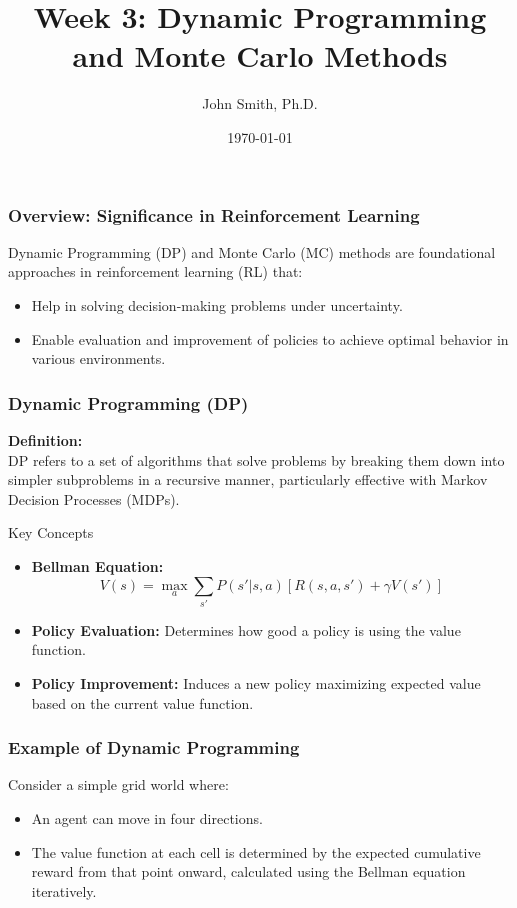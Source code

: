 \documentclass[aspectratio=169]{beamer}
\title[Dynamic Programming and Monte Carlo Methods]{Week 3: Dynamic Programming and Monte Carlo Methods}
\author[J. Smith]{John Smith, Ph.D.}
\institute[University Name]{
  Department of Computer Science\\
  University Name\\
  \vspace{0.3cm}
  Email: email@university.edu\\
  Website: www.university.edu
}
\date{\today}
\begin{document}
\frame{\titlepage}

\begin{frame}[fragile]
    \titlepage
\end{frame}

\begin{frame}[fragile]
    \frametitle{Overview: Significance in Reinforcement Learning}
    Dynamic Programming (DP) and Monte Carlo (MC) methods are foundational approaches in reinforcement learning (RL) that:
    \begin{itemize}
        \item Help in solving decision-making problems under uncertainty.
        \item Enable evaluation and improvement of policies to achieve optimal behavior in various environments.
    \end{itemize}
\end{frame}

\begin{frame}[fragile]
    \frametitle{Dynamic Programming (DP)}
    
    \textbf{Definition:} \\
    DP refers to a set of algorithms that solve problems by breaking them down into simpler subproblems in a recursive manner, particularly effective with Markov Decision Processes (MDPs).

    \begin{block}{Key Concepts}
        \begin{itemize}
            \item \textbf{Bellman Equation:} 
            \begin{equation}
                V(s) = \max_a \sum_{s'} P(s'|s,a) [R(s,a,s') + \gamma V(s')]
            \end{equation}
            \item \textbf{Policy Evaluation:} Determines how good a policy is using the value function.
            \item \textbf{Policy Improvement:} Induces a new policy maximizing expected value based on the current value function.
        \end{itemize}
    \end{block}
\end{frame}

\begin{frame}[fragile]
    \frametitle{Example of Dynamic Programming}
    Consider a simple grid world where:
    \begin{itemize}
        \item An agent can move in four directions.
        \item The value function at each cell is determined by the expected cumulative reward from that point onward, calculated using the Bellman equation iteratively.
    \end{itemize}
\end{frame}
\end{document}
